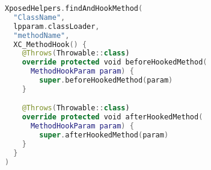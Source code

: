 \begin{lstlisting}[caption={Kotlin code to hook target method ``\textit{methodName}" of class ``\textit{ClassName}" using Xposed Framework},label={lst:hooking},language=Kotlin]
XposedHelpers.findAndHookMethod(
  "ClassName", 
  lpparam.classLoader, 
  "methodName", 
  XC_MethodHook() {
    @Throws(Throwable::class)
    override protected void beforeHookedMethod(
      MethodHookParam param) {
        super.beforeHookedMethod(param)
    }

    @Throws(Throwable::class)
    override protected void afterHookedMethod(
      MethodHookParam param) {
        super.afterHookedMethod(param)
    }
  }
)
\end{lstlisting}